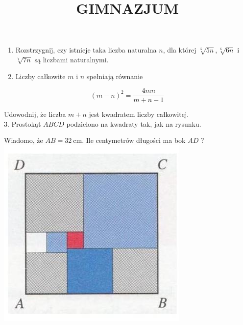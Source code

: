 \documentclass[10pt]{article}
\title{GIMNAZJUM }
\author{}
\date{}
\begin{document}
\maketitle
\begin{enumerate}
  \item Rozstrzygnij, czy istnieje taka liczba naturalna \(n\), dla której \(\sqrt[5]{5 n}, \sqrt[6]{6 n}\) i \(\sqrt[7]{7 n}\) są liczbami naturalnymi.
  \item Liczby całkowite \(m\) i \(n\) spełniają równanie
\end{enumerate}

\[
(m-n)^{2}=\frac{4 m n}{m+n-1}
\]

Udowodnij, że liczba \(m+n\) jest kwadratem liczby całkowitej.\\
3. Prostokąt \(A B C D\) podzielono na kwadraty tak, jak na rysunku.

Wiadomo, że \(A B=32 \mathrm{~cm}\). Ile centymetrów długości ma bok \(A D\) ?\\
\includegraphics[max width=\textwidth, center]{2024_11_21_6a3dc3e3d38c7fac1bfbg-1(1)}
\end{document}
